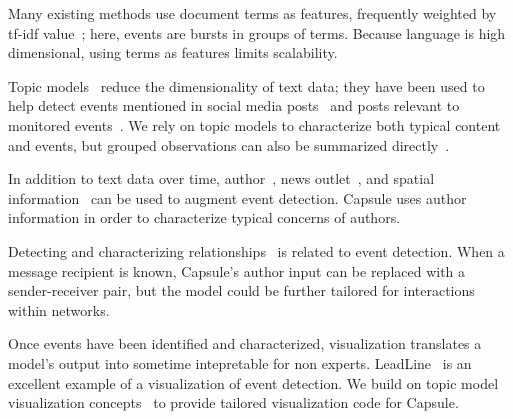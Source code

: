 Many existing methods use document terms as features, frequently weighted by tf-idf value~\cite{fung2005parameter,kumaran2004text,brants2003system,das2011dynamic,zhao2007temporal,zhao2012novel}; here, events are bursts in groups of terms.  Because language is high dimensional, using terms as features limits scalability.

Topic models~\cite{Blei:2012} reduce the dimensionality of text data; they have been used to help detect events mentioned in social media posts~\cite{lau2012line,dou2012leadline} and posts relevant to monitored events~\cite{VanDam:2012}.
We rely on topic models to characterize both typical content and events, but grouped observations can also be summarized directly~\cite{peng2007event,chakrabarti2011event,gao2012joint}.

In addition to text data over time, author~\cite{zhao2007temporal}, news outlet~\cite{wang2007mining}, and spatial information~\cite{Neill:2005,mathioudakis2010identifying,liu2011using} can be used to augment event detection.  Capsule uses author information in order to characterize typical concerns of authors.

Detecting and characterizing relationships~\cite{schein2015bayesian,linderman2014discovering,das2011dynamic} is related to event detection.  When a message recipient is known, Capsule's author input can be replaced with a sender-receiver pair, but the model could be further tailored for interactions within networks.

Once events have been identified and characterized, visualization translates a model's output into sometime intepretable for non experts.  LeadLine~\cite{dou2012leadline} is an excellent example of a visualization of event detection.  We build on topic model visualization concepts~\cite{chaney2012visualizing} to provide tailored visualization code for Capsule.